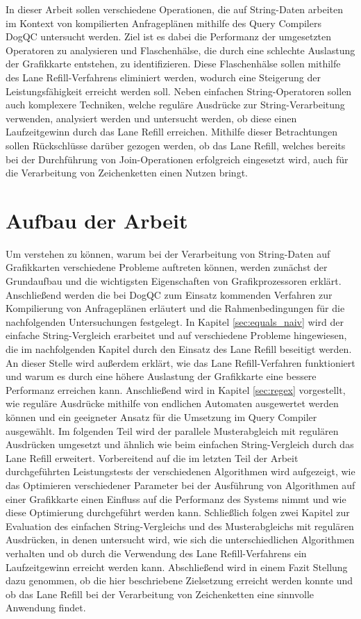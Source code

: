 In dieser Arbeit sollen verschiedene Operationen, die auf String-Daten arbeiten im Kontext von kompilierten Anfrageplänen mithilfe des Query Compilers DogQC untersucht werden.
Ziel ist es dabei die Performanz der umgesetzten Operatoren zu analysieren und Flaschenhälse, die durch eine schlechte Auslastung der Grafikkarte entstehen, zu identifizieren.
Diese Flaschenhälse sollen mithilfe des Lane Refill-Verfahrens eliminiert werden, wodurch eine Steigerung der Leistungsfähigkeit erreicht werden soll.
Neben einfachen String-Operatoren sollen auch komplexere Techniken, welche reguläre Ausdrücke zur String-Verarbeitung verwenden, analysiert werden und untersucht werden, ob diese einen Laufzeitgewinn durch das Lane Refill erreichen.
Mithilfe dieser Betrachtungen sollen Rückschlüsse darüber gezogen werden, ob das Lane Refill, welches bereits bei der Durchführung von Join-Operationen erfolgreich eingesetzt wird, auch für die Verarbeitung von Zeichenketten einen Nutzen bringt.

\section{Aufbau der Arbeit}

Um verstehen zu können, warum bei der Verarbeitung von String-Daten auf Grafikkarten verschiedene Probleme auftreten können, werden zunächst der Grundaufbau und die wichtigsten Eigenschaften von Grafikprozessoren erklärt.
Anschließend werden die bei DogQC zum Einsatz kommenden Verfahren zur Kompilierung von Anfrageplänen erläutert und die Rahmenbedingungen für die nachfolgenden Untersuchungen festgelegt.
In Kapitel \ref{sec:equals_naiv} wird der einfache String-Vergleich erarbeitet und auf verschiedene Probleme hingewiesen, die im nachfolgenden Kapitel durch den Einsatz des Lane Refill beseitigt werden.
An dieser Stelle wird außerdem erklärt, wie das Lane Refill-Verfahren funktioniert und warum es durch eine höhere Auslastung der Grafikkarte eine bessere Performanz erreichen kann.
Anschließend wird in Kapitel \ref{sec:regex} vorgestellt, wie reguläre Ausdrücke mithilfe von endlichen Automaten ausgewertet werden können und ein geeigneter Ansatz für die Umsetzung im Query Compiler ausgewählt.
Im folgenden Teil wird der parallele Musterabgleich mit regulären Ausdrücken umgesetzt und ähnlich wie beim einfachen String-Vergleich durch das Lane Refill erweitert.
Vorbereitend auf die im letzten Teil der Arbeit durchgeführten Leistungstests der verschiedenen Algorithmen wird aufgezeigt, wie das Optimieren verschiedener Parameter bei der Ausführung von Algorithmen auf einer Grafikkarte einen Einfluss auf die Performanz des Systems nimmt und wie diese Optimierung durchgeführt werden kann.
Schließlich folgen zwei Kapitel zur Evaluation des einfachen String-Vergleichs und des Musterabgleichs mit regulären Ausdrücken, in denen untersucht wird, wie sich die unterschiedlichen Algorithmen verhalten und ob durch die Verwendung des Lane Refill-Verfahrens ein Laufzeitgewinn erreicht werden kann.
Abschließend wird in einem Fazit Stellung dazu genommen, ob die hier beschriebene Zielsetzung erreicht werden konnte und ob das Lane Refill bei der Verarbeitung von Zeichenketten eine sinnvolle Anwendung findet.
